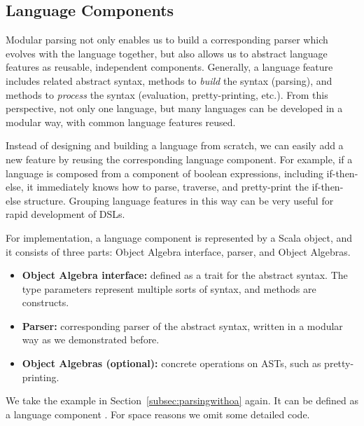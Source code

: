 \subsection{Language Components}\label{subsec:language-component}

Modular parsing not only enables us to build a corresponding parser
which evolves with the language together, but also allows us to
abstract language features as reusable, independent components.
Generally, a language feature includes related abstract syntax,
methods to \textit{build} the syntax (parsing), and methods to
\textit{process} the syntax (evaluation, pretty-printing, etc.). From
this perspective, not only one language, but many languages can be
developed in a modular way, with common language features reused.

Instead of designing and building a language from scratch, we can
easily add a new feature by reusing the corresponding language
component. For example, if a language is composed from a component of
boolean expressions, including if-then-else, it immediately knows how
to parse, traverse, and pretty-print the if-then-else structure.
Grouping language features in this way can
be very useful for rapid development of DSLs.

For implementation, a language component is represented by a Scala object, and it consists of three parts: Object Algebra interface, parser, and Object Algebras.

\begin{itemize}[leftmargin=*]
    \item \textbf{Object Algebra interface:} defined as a trait for the abstract syntax. The type parameters represent multiple sorts of syntax, and  methods are constructs.
    \item \textbf{Parser:} corresponding parser of the abstract syntax, written in a modular way as we demonstrated before.
    \item \textbf{Object Algebras (optional):} concrete operations on ASTs, such as pretty-printing.
\end{itemize}

We take the example in Section~\ref{subsec:parsingwithoa} again. It can be defined as a language component .
For space reasons we omit some detailed code.

\vspace{-4pt}
\vspace{-4pt}

